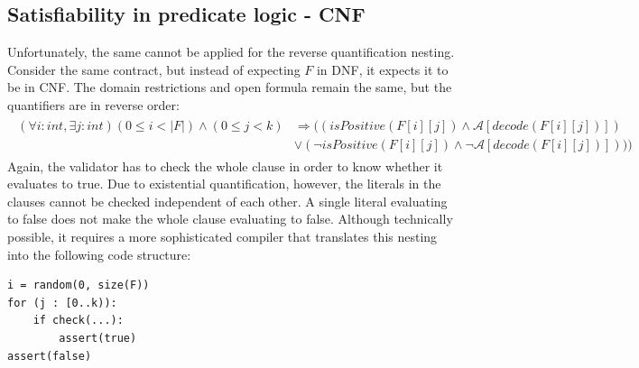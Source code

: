 \subsection{Satisfiability in predicate logic - CNF}
Unfortunately, the same cannot be applied for the reverse quantification nesting. Consider the same contract, but instead of expecting $F$ in DNF, it expects it to be in CNF. The domain restrictions and open formula remain the same, but the quantifiers are in reverse order:
\begin{gather*}\label{eq:cnf_sat}
\begin{aligned}
(\forall i : int, \exists j : int) (0 \leq i < |F|) \wedge (0 \leq j < k) &\Rightarrow ((isPositive(F[i][j]) \wedge \mathcal{A}[decode(F[i][j])]) \\
&\vee (\neg isPositive(F[i][j]) \wedge \neg \mathcal{A}[decode(F[i][j])])))
\end{aligned}
\end{gather*}
Again, the validator has to check the whole clause in order to know whether it evaluates to true. Due to existential quantification, however, the literals in the clauses cannot be checked independent of each other. A single literal evaluating to false does not make the whole clause evaluating to false. Although technically possible, it requires a more sophisticated compiler that translates this nesting into the following code structure:
\begin{lstlisting}[label=lst:rand_loop_dependent, numbers=none, caption=Translation of an assertion for a CNF SAT problem in pseudo-code]
i = random(0, size(F))
for (j : [0..k)):
	if check(...):
		assert(true)
assert(false)
\end{lstlisting}

